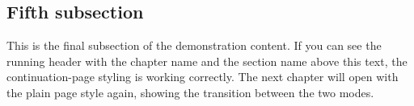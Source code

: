 \subsection{Fifth subsection}
This is the final subsection of the demonstration content. If you can see the running header with the chapter name and the section name above this text, the continuation-page styling is working correctly. The next chapter will open with the plain page style again, showing the transition between the two modes.
